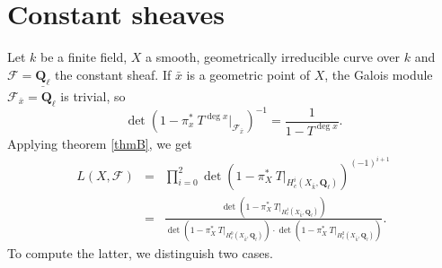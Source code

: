 \section{Constant sheaves}

Let $k$ be a finite field, $X$ a smooth, geometrically irreducible curve over
$k$ and $\mathcal{F} = \underline{\mathbf{Q}_\ell}$ the constant sheaf. If
$\bar x$ is a geometric point of $X$, the Galois module $\mathcal{F}_{\bar x} =
\mathbf{Q}_\ell$ is trivial, so
$$
\det\left(1-\pi_x^*\ T^{\deg x}\Big|_{\mathcal{F}_{\bar x}}\right)^{-1} =
\frac{1}{1-T^{\deg x}}.
$$
Applying theorem \ref{thmB}, we get
\begin{eqnarray*}
L(X, \mathcal{F}) & = & \prod_{i=0}^2 \det\left(1-\pi_X^*\
T\big|_{H_c^i(X_{\bar k}, \mathbf{Q}_\ell)}\right)^{(-1)^{i+1}} \\
& = &
\frac{\det\left(1-\pi_X^*\ T\big|_{H_c^1(X_{\bar k},
\mathbf{Q}_\ell)}\right)}{\det\left(1-\pi_X^*\ T\big|_{H_c^0(X_{\bar k},
\mathbf{Q}_\ell)}\right)\cdot\det\left(1-\pi_X^*\ T\big|_{H_c^2(X_{\bar k},
\mathbf{Q}_\ell)}\right)}.
\end{eqnarray*}
To compute the latter, we distinguish two cases.
